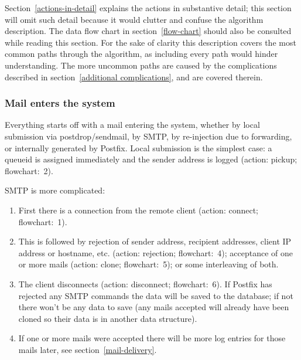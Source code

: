 \documentclass[a4paper,12pt,draft]{article}
\begin{document}
Section~\ref{actions-in-detail} explains the actions in substantive detail;
this section will omit such detail because it would clutter and confuse the
algorithm description.  The data flow chart in section~\ref{flow-chart}
should also be consulted while reading this section.  For the sake of
clarity this description covers the most common paths through the
algorithm, as including every path would hinder understanding.  The more
uncommon paths are caused by the complications described in
section~\ref{additional complications}, and are covered therein.

\subsubsection{Mail enters the system}

\label{mail-enters-the-system}

Everything starts off with a mail entering the system, whether by local
submission via postdrop/sendmail, by SMTP, by re-injection due to
forwarding, or internally generated by Postfix.  Local submission is the
simplest case: a queueid is assigned immediately and the sender address is
logged (action: pickup; flowchart:~2).

SMTP is more complicated: 

\begin{enumerate}
        
    \item First there is a connection from the remote client
        (action: connect; flowchart:~1).

    \item This is followed by rejection of sender address, recipient
        addresses, client IP address or hostname, etc. (action: rejection;
        flowchart:~4); acceptance of one or more mails (action: clone;
        flowchart:~5); or some interleaving of both.
        
    \item The client disconnects (action: disconnect; flowchart:~6).  If
        Postfix has rejected any SMTP commands the data will be saved to
        the database; if not there won't be any data to save (any mails
        accepted will already have been cloned so their data is in another
        data structure).

    \item If one or more mails were accepted there will be more log entries
        for those mails later, see section~\ref{mail-delivery}.

\end{enumerate}
\end{document}
